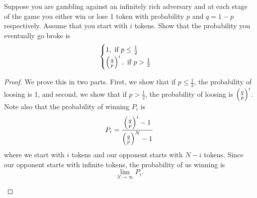 \documentclass{exam}
\begin{document}
\begin{questions}

\newpage
\question
Suppose you are gambling against an infinitely rich adversary and at each stage of the game you either win or lose 1 token with probability $p$ and $q = 1 - p$ respectively. Assume that you start with $i$ tokens. Show that the probability you eventually go broke is
$$\begin{cases}
    1, \text{ if } p \leq \frac{1}{2} \\
    \left( \frac{q}{p} \right)^i, \text{ if } p > \frac{1}{2}
\end{cases}$$
\begin{proof}
    We prove this in two parts. First, we show that if $p \leq \frac{1}{2}$, the probability of loosing is 1, and second, we show that if $p > \frac{1}{2}$, the probability of loosing is $\left( \frac{q}{p} \right)^i$. Note also that the probability of winning $P_i$ is 
    $$P_i = \frac{\left( \frac{q}{p} \right)^i - 1}{\left( \frac{q}{p} \right)^N - 1}$$
    where we start with $i$ tokens and our opponent starts with $N - i$ tokens. Since our opponent starts with infinite tokens, the probability of us winning is
    $$\lim_{N \rightarrow \infty} P_i.$$
    \begin{parts}

\end{parts}
\end{proof}
\end{questions}
\end{document}
